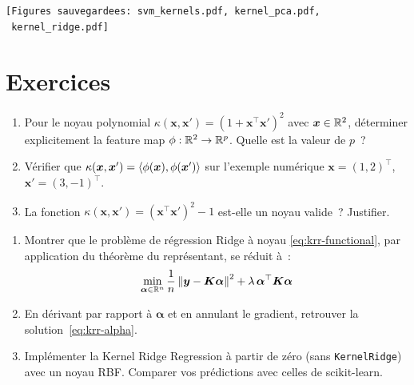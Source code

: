\begin{codeoutput}
\begin{verbatim}
[Figures sauvegardees: svm_kernels.pdf, kernel_pca.pdf,
 kernel_ridge.pdf]
\end{verbatim}
\end{codeoutput}

\section{Exercices}
\label{sec:exercises-ch12}

\begin{exercice}
\begin{enumerate}
  \item Pour le noyau polynomial $\kappa(\bm{x}, \bm{x}') =
    (1 + \bm{x}^\top \bm{x}')^2$ avec $\bm{x} \in \mathbb{R}^2$, d\'eterminer
    explicitement la feature map $\phi : \mathbb{R}^2 \to \mathbb{R}^p$.
    Quelle est la valeur de $p$~?
  \item V\'erifier que $\kappa(\bm{x}, \bm{x}') =
    \langle \phi(\bm{x}), \phi(\bm{x}') \rangle$ sur l'exemple num\'erique
    $\bm{x} = (1, 2)^\top$, $\bm{x}' = (3, -1)^\top$.
  \item La fonction $\kappa(\bm{x}, \bm{x}') = (\bm{x}^\top \bm{x}')^2
    - 1$ est-elle un noyau valide~? Justifier.
\end{enumerate}
\end{exercice}

\begin{exercice}
\begin{enumerate}
  \item Montrer que le probl\`eme de r\'egression Ridge \`a noyau
    \eqref{eq:krr-functional}, par application du th\'eor\`eme du
    repr\'esentant, se r\'eduit \`a~:
    \begin{equation*}
      \min_{\bm{\alpha} \in \mathbb{R}^n} \frac{1}{n}
      \left\| \bm{y} - \bm{K}\bm{\alpha} \right\|^2 +
      \lambda\, \bm{\alpha}^\top \bm{K} \bm{\alpha}
    \end{equation*}
  \item En d\'erivant par rapport \`a $\bm{\alpha}$ et en annulant le
    gradient, retrouver la solution~\eqref{eq:krr-alpha}.
  \item Impl\'ementer la Kernel Ridge Regression \`a partir de z\'ero
    (sans \texttt{KernelRidge}) avec un noyau RBF. Comparer vos
    pr\'edictions avec celles de scikit-learn.
\end{enumerate}
\end{exercice}

